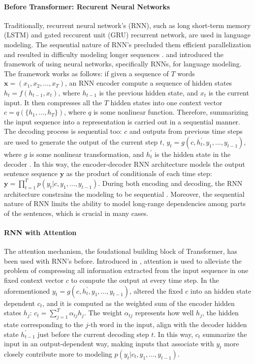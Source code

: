 \paragraph{Before Transformer: Recurent Neural Networks}
Traditionally, recurrent neural network's (RNN), such as long short-term memory (LSTM) and gated reccurent unit (GRU) recurrent network, are used in language modeling.
The sequential nature of RNN's precluded them efficient parallelization and resulted in difficulty modeling longer sequences \citep{attentionAllYouNeed}. 
\citet{encoderDecoderRNN} and \citet{encoderDecoderRNN2} introduced the framework of using neural networks, specifically 
RNNs, for language modeling. The framework works as follows:  
if given a sequence of $T$ words $\mathbf{x} =  (x_1,x_2,\dots, x_{T})$, an RNN encoder compute a sequence of hidden states $h_t = f(h_{t-1}, x_t)$, where $h_{t-1}$ is the previous hidden state, and $x_t$ is the current input. It then compresses all the $T$ hidden states into one context vector $c = q(\{h_1,\dots,h_T\})$, where $q$ is some nonlinear function. Therefore, summarizing the input sequence into a representation is carried out in a sequential manner.  
The decoding process is sequential too: $c$ and outputs from previous time steps are used to generate the output of the current step $t$, $y_t = g(c, h_t^{'}, y_1,\dots,y_{t-1})$, where $g$ is some nonlinear transformation, and $h_t^{'}$ is the hidden state in the decoder \citep{encoderDecoderRNN,encoderDecoderRNN2}.
In this way, the encoder-decoder RNN architecture models the output sentence sequence $\mathbf{y}$ as the product of conditionals of each time step: $\mathbf{y} = \prod_{t=1}^T p(y_t | c,y_1,\dots,y_{t-1})$.  
During both encoding and decoding, the RNN architecture constrains the modeling to be sequential \citep{attentionRNN}. Moreover, the sequential nature of RNN limits the ability to model long-range dependencies among parts of the sentences, which is crucial in many cases. 

\paragraph{RNN with Attention}
The attention mechanism, the foudational building block of Transformer, has been used with RNN's before. 
Introduced in \citet{attentionRNN}, attention is used to alleviate the problem of compressing all information extracted from the input sequence in one fixed context vector $c$ to compute the output at every time step. In the aforementioned 
$y_t = g(c, h_t^{'}, y_1,\dots,y_{t-1})$, \citet{attentionRNN} altered the fixed $c$ into an hidden state dependent $c_t$, and it is computed as the weighted sum of the encoder hidden states $h_j$: $c_t = \sum_{j=1}^{T} \alpha_{tj} h_j$. The weight $\alpha_{tj}$ represents how well $h_j$, the hidden state corresponding to the $j$-th word in the input, align with the decoder hidden state $h_{t-1}^{'}$ just before the current decoding step $t$. In this way, $c_t$ summarize the input in an output-dependent way, making inputs that associate with $y_t$ more closely contribute more to modeling $ p(y_t | c_t,y_1,\dots,y_{t-1})$.   


